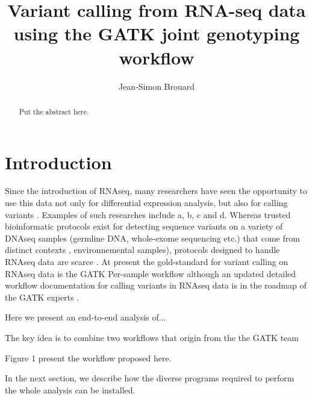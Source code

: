 \documentclass[]{article}
\title{Variant calling from RNA-seq data using the GATK joint genotyping workflow}
\author{Jean-Simon Brouard}
\begin{document}
\maketitle

\begin{abstract}
Put the abstract here.
\end{abstract}

\section{Introduction}
Since the introduction of RNAseq, many researchers have seen the opportunity to use this data not only for differential expression analysis, but also for calling variants \cite{Piskol2013}. Examples of such researches include a, b, c and d. Whereas trusted bioinformatic protocols exist for detecting sequence variants on a variety of DNAseq samples (germline DNA, whole-exome sequencing etc.) that come from distinct contexts \cite{Koboldt2020}, environnemental samples), protocols designed to handle RNAseq data are scarce \cite{Piskol2013}. At present the gold-standard for variant calling on RNAseq data is the GATK Per-sample workflow although an updated detailed workflow documentation for calling variants in RNAseq data is in the roadmap of the GATK experts \cite{GATK_best_RNAseq}.

Here we present an end-to-end analysis of...


The key idea is to combine two workflows that origin from the the GATK team

Figure 1 present the workflow proposed here.






In the next section, we describe how the diverse programs required to perform the whole analysis can be installed.







\end{document}

